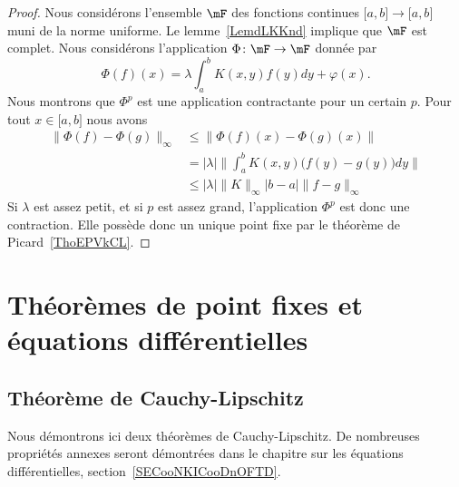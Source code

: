 \begin{proof}
	Nous considérons l'ensemble \( \mF\) des fonctions continues \( \mathopen[ a , b \mathclose]\to\mathopen[ a , b \mathclose]\) muni de la norme uniforme. Le lemme~\ref{LemdLKKnd} implique que \( \mF\) est complet. Nous considérons l'application \( \Phi\colon \mF\to \mF\) donnée par
	\begin{equation}
		\Phi(f)(x)=\lambda\int_a^bK(x,y)f(y)dy+\varphi(x).
	\end{equation}
	Nous montrons que \( \Phi^p\) est une application contractante pour un certain \( p\). Pour tout \( x\in \mathopen[ a , b \mathclose]\) nous avons
	\begin{subequations}
		\begin{align}
			\| \Phi(f)-\Phi(g) \|_{\infty} & \leq \| \Phi(f)(x)-\Phi(g)(x) \|                                    \\
			                               & =   | \lambda |\Big\| \int_a^bK(x,y)\big( f(y)-g(y) \big)dy  \Big\| \\
			                               & \leq  | \lambda |\| K \|_{\infty}| b-a |\| f-g \|_{\infty}
		\end{align}
	\end{subequations}
	Si \( \lambda\) est assez petit, et si \( p\) est assez grand, l'application \( \Phi^p\) est donc une contraction. Elle possède donc un unique point fixe par le théorème de Picard~\ref{ThoEPVkCL}.
\end{proof}

\section{Théorèmes de point fixes et équations différentielles}

\subsection{Théorème de Cauchy-Lipschitz}

Nous démontrons ici deux théorèmes de Cauchy-Lipschitz. De nombreuses propriétés annexes seront démontrées dans le chapitre sur les équations différentielles, section~\ref{SECooNKICooDnOFTD}.

